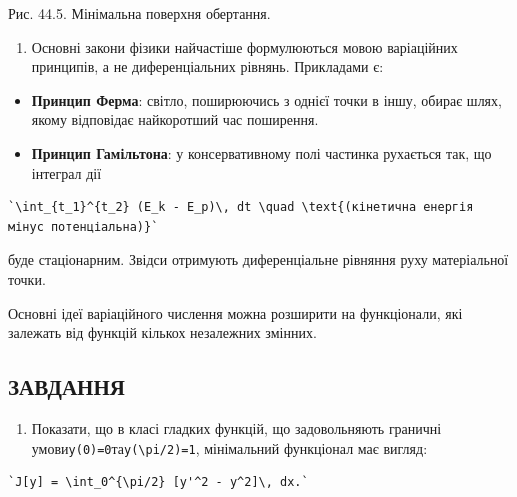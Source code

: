 \documentclass[
  ukrainian,
]{article}
\providecommand{\tightlist}{%
  \setlength{\itemsep}{0pt}\setlength{\parskip}{0pt}}
\begin{document}
Рис. 44.5. Мінімальна поверхня обертання.

\begin{enumerate}
\def\labelenumi{\arabic{enumi}.}
\setcounter{enumi}{3}
\tightlist
\item
  Основні закони фізики найчастіше формулюються мовою варіаційних
  принципів, а не диференціальних рівнянь. Прикладами є:
\end{enumerate}

\begin{itemize}
\tightlist
\item
  \textbf{Принцип Ферма}: світло, поширюючись з однієї точки в іншу,
  обирає шлях, якому відповідає найкоротший час поширення.
\item
  \textbf{Принцип Гамільтона}: у консервативному полі частинка рухається
  так, що інтеграл дії
\end{itemize}

\begin{verbatim}
`\int_{t_1}^{t_2} (E_k - E_p)\, dt \quad \text{(кінетична енергія мінус потенціальна)}`
\end{verbatim}

буде стаціонарним. Звідси отримують диференціальне рівняння руху
матеріальної точки.

Основні ідеї варіаційного числення можна розширити на функціонали, які
залежать від функцій кількох незалежних змінних.

\subsection{ЗАВДАННЯ}\label{ux437ux430ux432ux434ux430ux43dux43dux44f-9}

\begin{enumerate}
\def\labelenumi{\arabic{enumi}.}
\tightlist
\item
  Показати, що в класі гладких функцій, що задовольняють граничні
  умови\texttt{y(0)=0}та\texttt{y(\textbackslash{}pi/2)=1}, мінімальний
  функціонал має вигляд:
\end{enumerate}

\begin{verbatim}
`J[y] = \int_0^{\pi/2} [y'^2 - y^2]\, dx.`
\end{verbatim}
\end{document}
